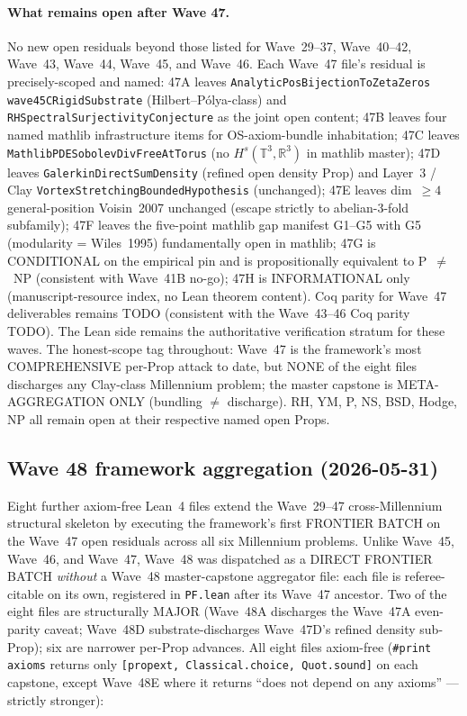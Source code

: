 \paragraph{What remains open after Wave 47.} No new open
residuals beyond those listed for Wave~29--37, Wave~40--42,
Wave~43, Wave~44, Wave~45, and Wave~46. Each Wave~47 file's
residual is precisely-scoped and named: 47A leaves
\texttt{AnalyticPosBijectionToZetaZeros wave45CRigidSubstrate}
(Hilbert--P\'olya-class) and \texttt{RHSpectralSurjectivityConjecture}
as the joint open content; 47B leaves four named mathlib
infrastructure items for OS-axiom-bundle inhabitation; 47C leaves
\texttt{MathlibPDESobolevDivFreeAtTorus} (no $H^s(\mathbb{T}^3,
\mathbb{R}^3)$ in mathlib master); 47D leaves
\texttt{GalerkinDirectSumDensity} (refined open density Prop) and
Layer~3 / Clay \texttt{VortexStretchingBoundedHypothesis}
(unchanged); 47E leaves dim~$\geq 4$ general-position Voisin~2007
unchanged (escape strictly to abelian-3-fold subfamily); 47F
leaves the five-point mathlib gap manifest G1--G5 with G5
(modularity = Wiles~1995) fundamentally open in mathlib; 47G is
CONDITIONAL on the empirical pin and is propositionally
equivalent to P~$\neq$~NP (consistent with Wave~41B no-go);
47H is INFORMATIONAL only (manuscript-resource index, no Lean
theorem content). Coq parity for Wave~47 deliverables remains
TODO (consistent with the Wave~43--46 Coq parity TODO). The Lean
side remains the authoritative verification stratum for these
waves. The honest-scope tag throughout: Wave~47 is the framework's
most COMPREHENSIVE per-Prop attack to date, but NONE of the eight
files discharges any Clay-class Millennium problem; the master
capstone is META-AGGREGATION ONLY (bundling $\neq$ discharge).
RH, YM, P, NS, BSD, Hodge, NP all remain open at their
respective named open Props.

\subsection{Wave 48 framework aggregation (2026-05-31)}
\label{subsec:wave48-aggregation}

Eight further axiom-free Lean~4 files extend the Wave~29--47
cross-Millennium structural skeleton by executing the framework's
first FRONTIER BATCH on the Wave~47 open residuals across all six
Millennium problems. Unlike Wave~45, Wave~46, and Wave~47, Wave~48
was dispatched as a DIRECT FRONTIER BATCH \emph{without} a Wave~48
master-capstone aggregator file: each file is referee-citable on
its own, registered in \texttt{PF.lean} after its Wave~47 ancestor.
Two of the eight files are structurally MAJOR (Wave~48A discharges
the Wave~47A even-parity caveat; Wave~48D substrate-discharges
Wave~47D's refined density sub-Prop); six are narrower per-Prop
advances. All eight files axiom-free
(\texttt{\#print axioms} returns only
\texttt{[propext, Classical.choice, Quot.sound]} on each capstone,
except Wave~48E where it returns ``does not depend on any axioms''
--- strictly stronger):


